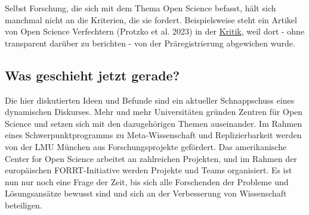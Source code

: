 \documentclass[
  letterpaper,
  DIV=11,
  numbers=noendperiod]{scrreprt}
\begin{document}
\begin{tcolorbox}[enhanced jigsaw, left=2mm, colback=white, colframe=quarto-callout-warning-color-frame, opacitybacktitle=0.6, opacityback=0, title=\textcolor{quarto-callout-warning-color}{\faExclamationTriangle}\hspace{0.5em}{Open Washing}, toptitle=1mm, coltitle=black, colbacktitle=quarto-callout-warning-color!10!white, titlerule=0mm, bottomtitle=1mm, leftrule=.75mm, breakable, rightrule=.15mm, bottomrule=.15mm, toprule=.15mm, arc=.35mm]

Selbst Forschung, die sich mit dem Thema Open Science befasst, hält sich
manchmal nicht an die Kriterien, die sie fordert. Beispielsweise steht
ein Artikel von Open Science Verfechtern (Protzko et al. 2023) in der
\href{https://statmodeling.stat.columbia.edu/2023/11/21/of-course-its-preregistered-just-give-me-a-sec/}{Kritik},
weil dort - ohne transparent darüber zu berichten - von der
Präregistrierung abgewichen wurde.

\end{tcolorbox}

\subsection*{Was geschieht jetzt
gerade?}\label{was-geschieht-jetzt-gerade}

Die hier diskutierten Ideen und Befunde sind ein aktueller Schnappschuss
eines dynamischen Diskurses. Mehr und mehr Universitäten gründen Zentren
für Open Science und setzen sich mit den dazugehörigen Themen
auseinander. Im Rahmen eines Schwerpunktprogramms zu Meta-Wissenschaft
und Replizierbarkeit werden von der LMU München aus Forschungsprojekte
gefördert. Das amerikanische Center for Open Science arbeitet an
zahlreichen Projekten, und im Rahmen der europäischen FORRT-Initiative
werden Projekte und Teams organisiert. Es ist nun nur noch eine Frage
der Zeit, bis sich alle Forschenden der Probleme und Lösungsansätze
bewusst sind und sich an der Verbesserung von Wissenschaft beteiligen.
\end{document}
